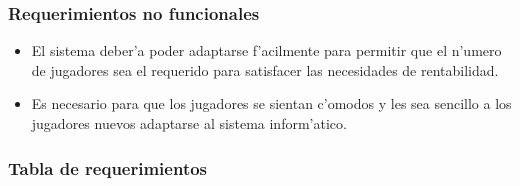 \subsubsection{Requerimientos no funcionales}

\begin{itemize}

\item {}

    El sistema deber'a poder adaptarse f'acilmente para permitir que el n'umero de jugadores sea el requerido para satisfacer las necesidades de rentabilidad.

\item {}

    Es necesario para que los jugadores se sientan c'omodos y les sea sencillo a los jugadores nuevos adaptarse al sistema inform'atico.

\end{itemize}


\subsubsection{Tabla de requerimientos}

